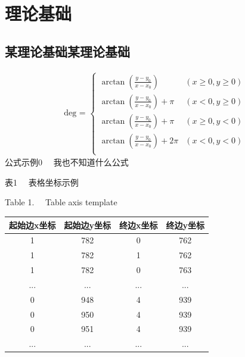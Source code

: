 \documentclass[UTF8,a4paper,12pt]{ctexart}
\begin{document}
	\section{理论基础}
	
	\subsection{某理论基础某理论基础}
	\begin{equation}
		\begin{array}{c}
			\text {deg  = }\left\{\begin{array}{lc}
				\arctan (\frac{y-y_{0}}{x-x_{0}}) & (x\ge 0,y\ge 0) \\
				\arctan (\frac{y-y_{0}}{x-x_{0}})+\pi & (x<  0,y\ge 0) \\
				\arctan (\frac{y-y_{0}}{x-x_{0}})+\pi & (x\ge 0,y<  0) \\
				\arctan (\frac{y-y_{0}}{x-x_{0}})+2\pi & (x<  0,y<  0) \\
			\end{array}\right.
		\end{array}
	\end{equation}
	公式示例0  \ \  我也不知道什么公式

	
	\begin{table}[htp]
		\renewcommand\arraystretch{1.6}
		\setlength\tabcolsep{20pt}
		\centering
		\begin{center}
			\fontsize{10.5pt}{\baselineskip}\heiti 表1  \ \  表格坐标示例 \par Table 1. \ \ Table axis template
		\end{center} 
		\vspace{-0.4cm} 
		\begin{tabular}{cccc}
			\toprule
			起始边x坐标&起始边y坐标&终边x坐标&终边y坐标\\
			\midrule
			1&782&0&762\\
			1&782&1&762\\
			1&782&0&763\\
			...&...&...&...\\
			0&948&4&939\\
			0&950&4&939\\
			0&951&4&939\\
			...&...&...&...\\
			\bottomrule
		\end{tabular}
		\vspace{-0.4cm} 
	\end{table}
	
\end{document}
